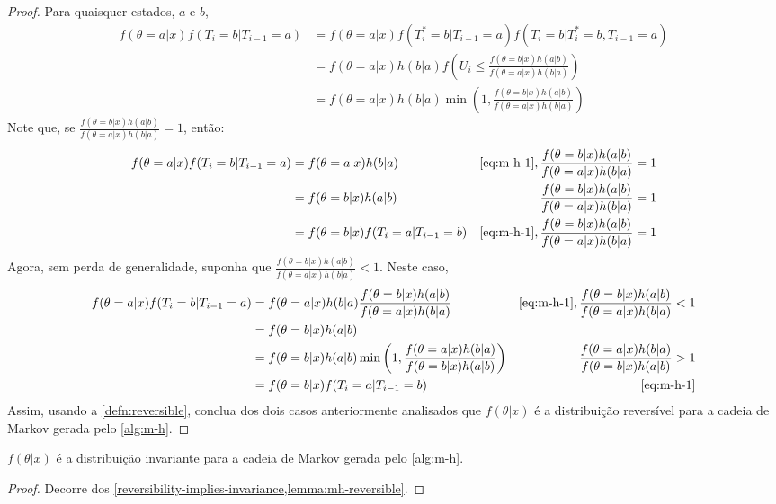 \begin{proof}
 Para quaisquer estados, $a$ e $b$,
 \begin{align}
  \label{eq:m-h-1}
  f(\theta=a|x)f(T_{i}=b|T_{i-1}=a)
  &= f(\theta=a|x)f(T^{*}_i=b|T_{i-1}=a)
  f(T_{i}=b|T^{*}_{i}=b,T_{i-1}=a) \nonumber \\
  &= f(\theta=a|x)h(b|a)
  f\left(U_i \leq \frac{f(\theta=b|x)h(a|b)}
  {f(\theta=a|x)h(b|a)}\right) \nonumber \\
  &= f(\theta=a|x)h(b|a)
  \min\left(1,\frac{f(\theta=b|x)h(a|b)}
  {f(\theta=a|x)h(b|a)}\right)
 \end{align}
 Note que, se $\frac{f(\theta=b|x)h(a|b)}{f(\theta=a|x)h(b|a)}=1$, então:
 \begin{align*}
  f(\theta=a|x)f(T_{i}=b|T_{i-1}=a) &=
  f(\theta=a|x)h(b|a)
  & \text{\cref{eq:m-h-1}},
  \frac{f(\theta=b|x)h(a|b)}{f(\theta=a|x)h(b|a)}=1\\
  &= f(\theta=b|x)h(a|b)
  &\frac{f(\theta=b|x)h(a|b)}{f(\theta=a|x)h(b|a)}=1\\
  &= f(\theta=b|x)f(T_{i}=a|T_{i-1}=b)
  & \text{\cref{eq:m-h-1}},
  \frac{f(\theta=b|x)h(a|b)}{f(\theta=a|x)h(b|a)}=1
 \end{align*}
 Agora, sem perda de generalidade, suponha que
 $\frac{f(\theta=b|x)h(a|b)}{f(\theta=a|x)h(b|a)}<1$.
 Neste caso,
 \begin{align*}
  f(\theta=a|x)f(T_{i}=b|T_{i-1}=a) &=
  f(\theta=a|x)h(b|a)
  \frac{f(\theta=b|x)h(a|b)}
  {f(\theta=a|x)h(b|a)}
  & \text{\cref{eq:m-h-1}},
  \frac{f(\theta=b|x)h(a|b)}{f(\theta=a|x)h(b|a)}<1\\
  &= f(\theta=b|x)h(a|b) \\
  &= f(\theta=b|x)h(a|b)
  \min\left(1,\frac{f(\theta=a|x)h(b|a)}
  {f(\theta=b|x)h(a|b)}\right)
  &\frac{f(\theta=a|x)h(b|a)}{f(\theta=b|x)h(a|b)}>1\\
  &=f(\theta=b|x)f(T_i=a|T_{i-1}=b)
  & \text{\cref{eq:m-h-1}}
 \end{align*}
 Assim, usando a \cref{defn:reversible},
 conclua dos dois casos anteriormente
 analisados que $f(\theta|x)$ é a 
 distribuição reversível para a cadeia de Markov
 gerada pelo \cref{alg:m-h}.
\end{proof}

\begin{theorem}
 \label{thm:mh-invariant}
 $f(\theta|x)$ é a distribuição invariante para
 a cadeia de Markov gerada pelo \cref{alg:m-h}.
\end{theorem}

\begin{proof}
 Decorre dos \cref{reversibility-implies-invariance,lemma:mh-reversible}.
\end{proof}

